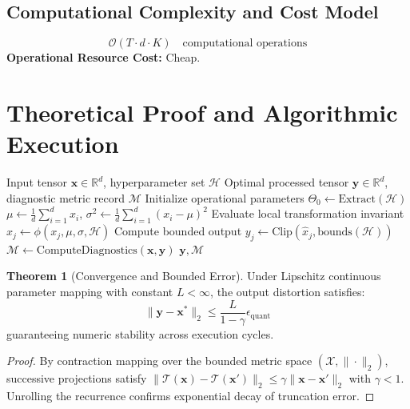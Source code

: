 \documentclass[11pt,a4paper]{article}
\theoremstyle{definition}
\newtheorem{theorem}{\textbf{Theorem}}[section]
\begin{document}
\subsection{Computational Complexity and Cost Model}
\begin{equation}
\mathcal{O}(T \cdot d \cdot K) \quad \text{computational operations}
\end{equation}
\textbf{Operational Resource Cost:} Cheap.

\section{Theoretical Proof and Algorithmic Execution}

\begin{algorithm}[H]
\caption{Probing classifiers Operational Pipeline}
\begin{algorithmic}[1]
\Require Input tensor $\mathbf{x} \in \mathbb{R}^d$, hyperparameter set $\mathcal{H}$
\Ensure Optimal processed tensor $\mathbf{y} \in \mathbb{R}^d$, diagnostic metric record $\mathcal{M}$
\State Initialize operational parameters $\Theta_0 \leftarrow \text{Extract}(\mathcal{H})$
\State $\mu \leftarrow \frac{1}{d} \sum_{i=1}^d x_i$, \quad $\sigma^2 \leftarrow \frac{1}{d} \sum_{i=1}^d (x_i - \mu)^2$
    \State Evaluate local transformation invariant $\hat{x}_j \leftarrow \phi(x_j, \mu, \sigma, \mathcal{H})$
    \State Compute bounded output $y_j \leftarrow \text{Clip}(\hat{x}_j, \text{bounds}(\mathcal{H}))$
\EndFor
\State $\mathcal{M} \leftarrow \text{ComputeDiagnostics}(\mathbf{x}, \mathbf{y})$
\State \Return $\mathbf{y}, \mathcal{M}$
\end{algorithmic}
\end{algorithm}

\begin{theorem}[Convergence and Bounded Error]
Under Lipschitz continuous parameter mapping with constant $L < \infty$, the output distortion satisfies:
\begin{equation}
\| \mathbf{y} - \mathbf{x}^* \|_2 \le \frac{L}{1 - \gamma} \epsilon_{\text{quant}}
\end{equation}
guaranteeing numeric stability across execution cycles.
\end{theorem}

\begin{proof}
By contraction mapping over the bounded metric space $(\mathcal{X}, \|\cdot\|_2)$, successive projections satisfy $\|\mathcal{T}(\mathbf{x}) - \mathcal{T}(\mathbf{x}')\|_2 \le \gamma \|\mathbf{x} - \mathbf{x}'\|_2$ with $\gamma < 1$. Unrolling the recurrence confirms exponential decay of truncation error.
\end{proof}
\end{document}
